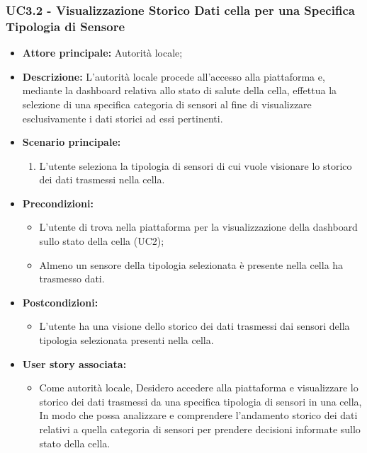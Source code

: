 \subsubsection{UC3.2 - Visualizzazione Storico Dati cella per una Specifica Tipologia di Sensore}
\begin{itemize}
    \item \textbf{Attore principale:} Autorità locale;
    \item \textbf{Descrizione:} L’autorità locale procede all’accesso alla piattaforma e, mediante la
          dashboard relativa allo stato di salute della cella, effettua la selezione di una specifica
          categoria di sensori al fine di visualizzare esclusivamente i dati storici ad essi pertinenti.
    \item \textbf{Scenario principale:}
          \begin{enumerate}
              \item L'utente seleziona la tipologia di sensori di cui vuole visionare lo storico dei dati trasmessi nella cella.
          \end{enumerate}
    \item \textbf{Precondizioni:}
          \begin{itemize}
              \item L'utente di trova nella piattaforma per la visualizzazione della dashboard sullo stato della cella (UC2);
              \item  Almeno un sensore della tipologia selezionata è presente nella cella ha trasmesso dati.
          \end{itemize}
    \item \textbf{Postcondizioni:}
          \begin{itemize}
              \item  L'utente ha una visione dello storico dei dati trasmessi dai sensori della tipologia selezionata presenti nella cella.
          \end{itemize}
    \item \textbf{User story associata:}
          \begin{itemize}
              \item Come autorità locale,
                    Desidero accedere alla piattaforma e visualizzare lo storico dei dati trasmessi da una specifica tipologia di sensori in una cella,
                    In modo che possa analizzare e comprendere l'andamento storico dei dati relativi a quella categoria di sensori per prendere decisioni informate sullo stato della cella.
          \end{itemize}
\end{itemize}